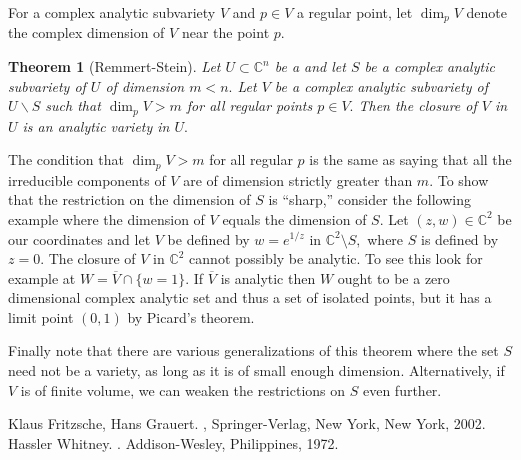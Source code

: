 \documentclass[12pt]{article}
\theoremstyle{theorem}
\newtheorem*{thm}{Theorem}
\theoremstyle{definition}
\begin{document}
For a complex analytic subvariety $V$ and $p \in V$ a regular point, let $\dim_p V$ denote the complex dimension of $V$ near the point $p.$

\begin{thm}[Remmert-Stein]
Let $U \subset {\mathbb{C}}^n$ be a  and let $S$ be a complex analytic subvariety of $U$ of
dimension $m < n.$  Let $V$ be a complex analytic subvariety of $U \backslash S$ such that $\dim_p V > m$ for all
regular points $p \in V.$  Then the closure of $V$ in $U$ is an analytic variety in $U.$
\end{thm}

The condition that $\dim_p V > m$ for all regular $p$ is the same as saying that all the irreducible
components of $V$ are of dimension strictly greater than $m.$  To show that the restriction on the dimension
of $S$ is ``sharp,''
consider the following example where the dimension of $V$ equals the dimension of $S$.
Let $(z,w) \in {\mathbb C}^2$ be our coordinates and let $V$ be defined by $w = e^{1/z}$ in ${\mathbb C}^2 \setminus S,$ where $S$ is defined by $z = 0.$  The closure of $V$ in ${\mathbb C}^2$ cannot possibly be
analytic.  To see this look for example at $W = \overline{V} \cap \{ w = 1 \}.$
If $\overline{V}$ is analytic then $W$ ought to be a zero dimensional
complex analytic set and thus a set of isolated points, but it has a limit point $(0,1)$ by Picard's theorem. 

Finally note that there are various generalizations of this theorem where the set $S$ need not be a variety,
as long as it is of small enough dimension.  Alternatively, if $V$ is of finite volume, we can weaken the
restrictions on $S$ even further.

\begin{thebibliography}{9}
Klaus Fritzsche, Hans Grauert.
{\em {}},
Springer-Verlag, New York, New York, 2002.
Hassler Whitney.
{\em {}}.
Addison-Wesley, Philippines, 1972.
\end{thebibliography}
\end{document}

